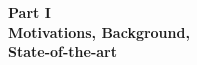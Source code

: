 
\vspace*{\fill}
\begin{center}
   \Huge{\textbf{Part I}} \\
\Huge{\textbf{Motivations, Background,}} \\
\Huge{\textbf{State-of-the-art}}
\end{center}
\vspace*{\fill}





\newpage